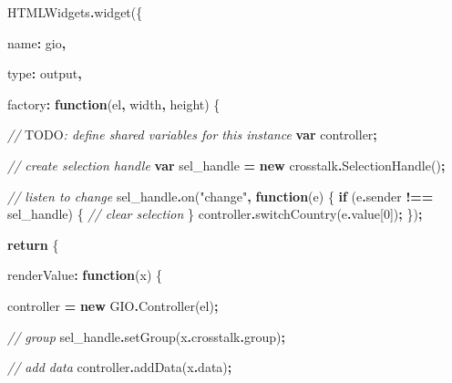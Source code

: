 \documentclass[
]{krantz}
\makeatletter
\newenvironment{Shaded}{\begin{snugshade}}{\end{snugshade}}
\newcommand{\AlertTok}[1]{\textcolor[rgb]{0.33,0.33,0.33}{#1}}
\newcommand{\AttributeTok}[1]{\textcolor[rgb]{0.61,0.61,0.61}{#1}}
\newcommand{\CommentTok}[1]{\textcolor[rgb]{0.37,0.37,0.37}{\textit{#1}}}
\newcommand{\ControlFlowTok}[1]{\textcolor[rgb]{0.27,0.27,0.27}{\textbf{#1}}}
\newcommand{\DataTypeTok}[1]{\textcolor[rgb]{0.27,0.27,0.27}{#1}}
\newcommand{\DecValTok}[1]{\textcolor[rgb]{0.06,0.06,0.06}{#1}}
\newcommand{\FunctionTok}[1]{\textcolor[rgb]{0,0,0}{#1}}
\newcommand{\KeywordTok}[1]{\textcolor[rgb]{0.27,0.27,0.27}{\textbf{#1}}}
\newcommand{\NormalTok}[1]{#1}
\newcommand{\OperatorTok}[1]{\textcolor[rgb]{0.43,0.43,0.43}{\textbf{#1}}}
\newcommand{\StringTok}[1]{\textcolor[rgb]{0.5,0.5,0.5}{#1}}
\newenvironment{kframe}{%
\medskip{}
\setlength{\fboxsep}{.8em}
 \def\at@end@of@kframe{}%
 \ifinner\ifhmode%
  \def\at@end@of@kframe{\end{minipage}}%
  \begin{minipage}{\columnwidth}%
 \fi\fi%
 \def\FrameCommand##1{\hskip\@totalleftmargin \hskip-\fboxsep
 \colorbox{shadecolor}{##1}\hskip-\fboxsep
     \hskip-\linewidth \hskip-\@totalleftmargin \hskip\columnwidth}%
 \MakeFramed {\advance\hsize-\width
   \@totalleftmargin\z@ \linewidth\hsize
   \@setminipage}}%
 {\par\unskip\endMakeFramed%
 \at@end@of@kframe}
\renewenvironment{Shaded}{\begin{kframe}}{\end{kframe}}
\makeatother
\begin{document}
\begin{Shaded}
\begin{Highlighting}[]
\NormalTok{HTMLWidgets}\OperatorTok{.}\FunctionTok{widget}\NormalTok{(\{}

  \DataTypeTok{name}\OperatorTok{:} \StringTok{\textquotesingle{}gio\textquotesingle{}}\OperatorTok{,}

  \DataTypeTok{type}\OperatorTok{:} \StringTok{\textquotesingle{}output\textquotesingle{}}\OperatorTok{,}

  \DataTypeTok{factory}\OperatorTok{:} \KeywordTok{function}\NormalTok{(el}\OperatorTok{,}\NormalTok{ width}\OperatorTok{,}\NormalTok{ height) \{}

    \CommentTok{// }\AlertTok{TODO}\CommentTok{: define shared variables for this instance}
    \KeywordTok{var}\NormalTok{ controller}\OperatorTok{;}

    \CommentTok{// create selection handle}
    \KeywordTok{var}\NormalTok{ sel\_handle }\OperatorTok{=} \KeywordTok{new}\NormalTok{ crosstalk}\OperatorTok{.}\FunctionTok{SelectionHandle}\NormalTok{()}\OperatorTok{;}

    \CommentTok{// listen to change}
\NormalTok{    sel\_handle}\OperatorTok{.}\FunctionTok{on}\NormalTok{(}\StringTok{"change"}\OperatorTok{,} \KeywordTok{function}\NormalTok{(e) \{}
      \ControlFlowTok{if}\NormalTok{ (e}\OperatorTok{.}\AttributeTok{sender} \OperatorTok{!==}\NormalTok{ sel\_handle) \{}
        \CommentTok{// clear selection}
\NormalTok{      \}}
\NormalTok{      controller}\OperatorTok{.}\FunctionTok{switchCountry}\NormalTok{(e}\OperatorTok{.}\AttributeTok{value}\NormalTok{[}\DecValTok{0}\NormalTok{])}\OperatorTok{;}
\NormalTok{    \})}\OperatorTok{;}


    \ControlFlowTok{return}\NormalTok{ \{}

      \DataTypeTok{renderValue}\OperatorTok{:} \KeywordTok{function}\NormalTok{(x) \{}

\NormalTok{        controller }\OperatorTok{=} \KeywordTok{new}\NormalTok{ GIO}\OperatorTok{.}\FunctionTok{Controller}\NormalTok{(el)}\OperatorTok{;}

        \CommentTok{// group}
\NormalTok{        sel\_handle}\OperatorTok{.}\FunctionTok{setGroup}\NormalTok{(x}\OperatorTok{.}\AttributeTok{crosstalk}\OperatorTok{.}\AttributeTok{group}\NormalTok{)}\OperatorTok{;}
        
        \CommentTok{// add data}
\NormalTok{        controller}\OperatorTok{.}\FunctionTok{addData}\NormalTok{(x}\OperatorTok{.}\AttributeTok{data}\NormalTok{)}\OperatorTok{;}


\end{Highlighting}
\end{Shaded}
\end{document}

